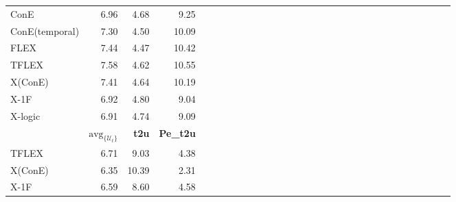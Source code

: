 \begin{table*}
{\begin{tabular}{lrrrrrrrrrrrrrrrrrrrrrrrrrrrrr }
      ConE           & 6.96                             & 4.68             & 9.25                                                                                                                                       \\
      ConE(temporal) & 7.30&   4.50&  10.09\\
      FLEX           & 7.44                             & 4.47             & 10.42                                                                                                                                      \\
      TFLEX          & 7.58                             & 4.62             & 10.55                                                                                                                                      \\
      X(ConE)        & 7.41                             & 4.64             & 10.19                                                                                                                                      \\
      X-1F           & 6.92                             & 4.80             & 9.04                                                                                                                                       \\
      X-logic        & 6.91                             & 4.74             & 9.09                                                                                                                                       \\
      \midrule
      \midrule
                     & $\text{avg}_{\{\mathcal{U}_t\}}$ & \textbf{t2u}     & \textbf{Pe\_t2u}                                                                                                                           \\
      \midrule
      TFLEX          & 6.71                             & 9.03             & 4.38                                                                                                                                       \\
      X(ConE)        & 6.35                             & 10.39            & 2.31                                                                                                                                       \\
      X-1F           & 6.59                             & 8.60             & 4.58                                                                                                                                       \\

\end{tabular}}
\end{table*}

